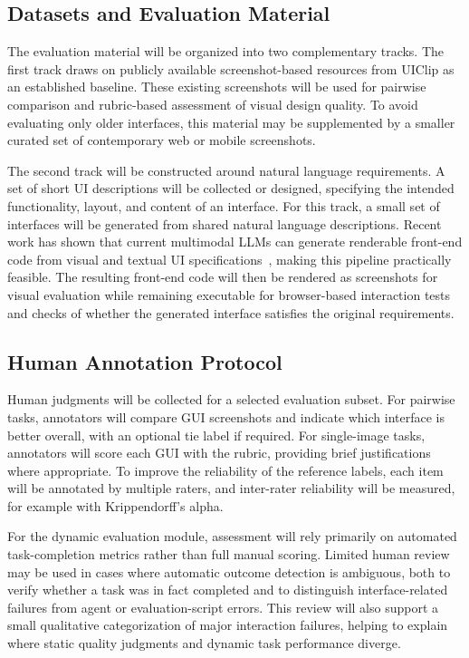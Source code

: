 \documentclass[pdflatex,sn-mathphys-num]{sn-jnl}
\begin{document}
\subsection{Datasets and Evaluation Material}

The evaluation material will be organized into two complementary tracks. The first
track draws on publicly available screenshot-based resources from UIClip as an
established baseline. These existing screenshots will be used for pairwise comparison
and rubric-based assessment of visual design quality. To avoid evaluating only older
interfaces, this material may be supplemented by a smaller curated set of contemporary
web or mobile screenshots.

The second track will be constructed around natural language requirements. A set of
short UI descriptions will be collected or designed, specifying the intended
functionality, layout, and content of an interface. For this track, a small set of
interfaces will be generated from shared natural language descriptions. Recent work
has shown that current multimodal LLMs can generate renderable front-end code from
visual and textual UI specifications~\cite{design2code}, making this pipeline
practically feasible. The resulting front-end code will then be rendered as screenshots
for visual evaluation while remaining executable for browser-based interaction tests
and checks of whether the generated interface satisfies the original requirements.

\subsection{Human Annotation Protocol}

Human judgments will be collected for a selected evaluation subset. For pairwise tasks,
annotators will compare GUI screenshots and indicate which interface is better overall,
with an optional tie label if required. For single-image tasks, annotators will score
each GUI with the rubric, providing brief justifications where appropriate. To improve
the reliability of the reference labels, each item will be annotated by multiple
raters, and inter-rater reliability will be measured, for example with
Krippendorff's alpha.

For the dynamic evaluation module, assessment will rely primarily on automated
task-completion metrics rather than full manual scoring. Limited human review may be
used in cases where automatic outcome detection is ambiguous, both to verify whether a
task was in fact completed and to distinguish interface-related failures from agent or
evaluation-script errors. This review will also support a small qualitative
categorization of major interaction failures, helping to explain where static quality
judgments and dynamic task performance diverge.
\end{document}
